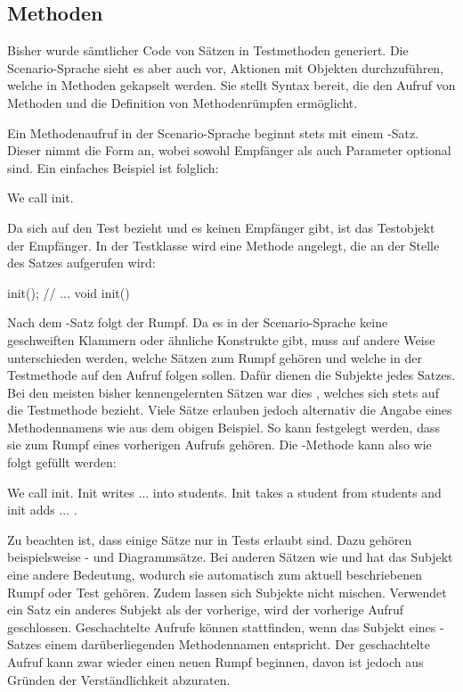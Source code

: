 \subsection{Methoden}\label{subsec:methods}

Bisher wurde sämtlicher Code von Sätzen in Testmethoden generiert.
Die Scenario-Sprache sieht es aber auch vor, Aktionen mit Objekten durchzuführen, welche in Methoden gekapselt werden.
Sie stellt Syntax bereit, die den Aufruf von Methoden und die Definition von Methodenrümpfen ermöglicht.

Ein Methodenaufruf in der Scenario-Sprache beginnt stets mit einem -Satz.
Dieser nimmt die Form  an, wobei sowohl Empfänger als auch Parameter optional sind.
Ein einfaches Beispiel ist folglich:

\begin{codeblock}
    We call init.
\end{codeblock}

Da sich  auf den Test bezieht und es keinen Empfänger gibt, ist das Testobjekt der Empfänger.
In der Testklasse wird eine Methode  angelegt, die an der Stelle des Satzes aufgerufen wird:

\begin{jcodeblock}
    init();
    // ...
    void init() {
    }
\end{jcodeblock}

Nach dem -Satz folgt der Rumpf.
Da es in der Scenario-Sprache keine geschweiften Klammern oder ähnliche Konstrukte gibt, muss auf andere Weise unterschieden werden, welche Sätzen zum Rumpf gehören und welche in der Testmethode auf den Aufruf folgen sollen.
Dafür dienen die Subjekte jedes Satzes.
Bei den meisten bisher kennengelernten Sätzen war dies , welches sich stets auf die Testmethode bezieht.
Viele Sätze erlauben jedoch alternativ die Angabe eines Methodennamens wie  aus dem obigen Beispiel.
So kann festgelegt werden, dass sie zum Rumpf eines vorherigen Aufrufs gehören.
Die -Methode kann also wie folgt gefüllt werden:

\begin{codeblock}
    We call init.
    Init writes ... into students.
    Init takes a student from students and init adds ... .
\end{codeblock}

Zu beachten ist, dass einige Sätze nur in Tests erlaubt sind.
Dazu gehören beispielsweise - und Diagrammsätze.
Bei anderen Sätzen wie  und  hat das Subjekt eine andere Bedeutung, wodurch sie automatisch zum aktuell beschriebenen Rumpf oder Test gehören.
Zudem lassen sich Subjekte nicht mischen.
Verwendet ein Satz ein anderes Subjekt als der vorherige, wird der vorherige Aufruf geschlossen.
Geschachtelte Aufrufe können stattfinden, wenn das Subjekt eines -Satzes einem darüberliegenden Methodennamen entspricht.
Der geschachtelte Aufruf kann zwar wieder einen neuen Rumpf beginnen, davon ist jedoch aus Gründen der Verständlichkeit abzuraten.

